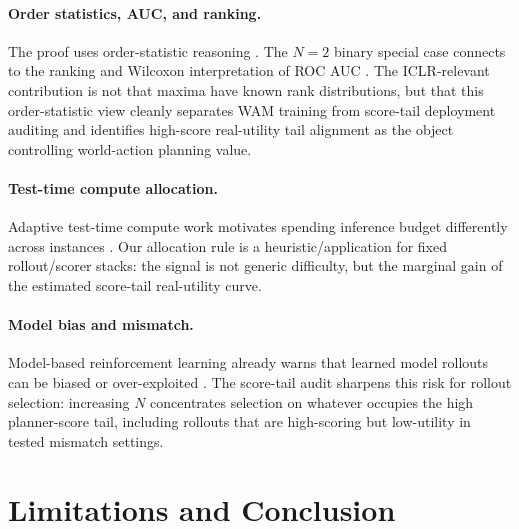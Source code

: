 \documentclass{article}
\begin{document}
\paragraph{Order statistics, AUC, and ranking.}
The proof uses order-statistic reasoning \citep{david2003orderstatistics}. The $N=2$ binary special case connects to the ranking and Wilcoxon interpretation of ROC AUC \citep{hanley1982roc}. The ICLR-relevant contribution is not that maxima have known rank distributions, but that this order-statistic view cleanly separates WAM training from score-tail deployment auditing and identifies high-score real-utility tail alignment as the object controlling world-action planning value.

\paragraph{Test-time compute allocation.}
Adaptive test-time compute work motivates spending inference budget differently across instances \citep{snell2024testtime}. Our allocation rule is a heuristic/application for fixed rollout/scorer stacks: the signal is not generic difficulty, but the marginal gain of the estimated score-tail real-utility curve.

\paragraph{Model bias and mismatch.}
Model-based reinforcement learning already warns that learned model rollouts can be biased or over-exploited \citep{janner2019mbpo}. The score-tail audit sharpens this risk for rollout selection: increasing $N$ concentrates selection on whatever occupies the high planner-score tail, including rollouts that are high-scoring but low-utility in tested mismatch settings.

\section{Limitations and Conclusion}
\label{sec:limitations}
\end{document}
